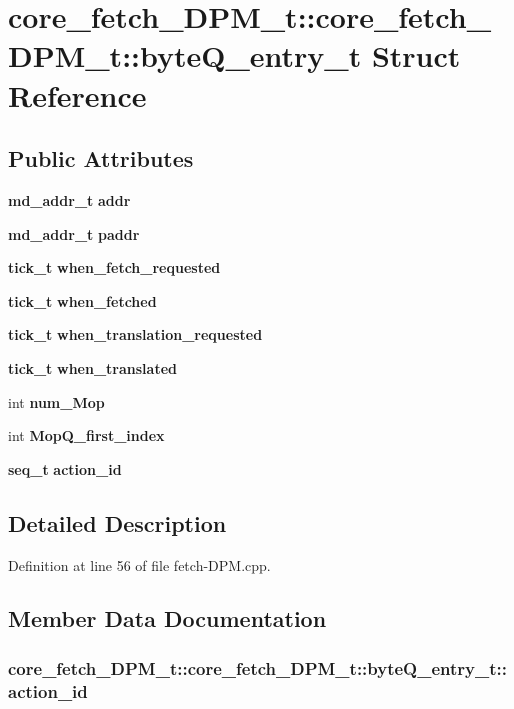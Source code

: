 \section{core\_\-fetch\_\-DPM\_\-t::core\_\-fetch\_\-DPM\_\-t::byteQ\_\-entry\_\-t Struct Reference}
\label{structcore__fetch__DPM__t_1_1byteQ__entry__t}
\subsection*{Public Attributes}
\begin{CompactItemize}
\item 
{\bf md\_\-addr\_\-t} {\bf addr}
\item 
{\bf md\_\-addr\_\-t} {\bf paddr}
\item 
{\bf tick\_\-t} {\bf when\_\-fetch\_\-requested}
\item 
{\bf tick\_\-t} {\bf when\_\-fetched}
\item 
{\bf tick\_\-t} {\bf when\_\-translation\_\-requested}
\item 
{\bf tick\_\-t} {\bf when\_\-translated}
\item 
int {\bf num\_\-Mop}
\item 
int {\bf MopQ\_\-first\_\-index}
\item 
{\bf seq\_\-t} {\bf action\_\-id}
\end{CompactItemize}


\subsection{Detailed Description}


Definition at line 56 of file fetch-DPM.cpp.

\subsection{Member Data Documentation}
\subsubsection[{action\_\-id}]{ core\_\-fetch\_\-DPM\_\-t::core\_\-fetch\_\-DPM\_\-t::byteQ\_\-entry\_\-t::action\_\-id}\label{structcore__fetch__DPM__t_1_1byteQ__entry__t_c555380c3a53e4f078ea7e80c539d128}




